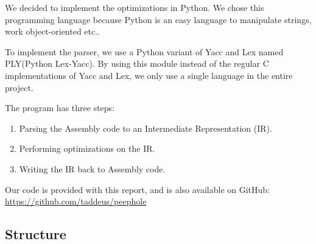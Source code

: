 \documentclass[10pt,a4paper]{article}
\begin{document}
We decided to implement the optimizations in Python. We chose this programming
language because Python is an easy language to manipulate strings, work
object-oriented etc..

To implement the parser, we use a Python variant of Yacc and Lex named
PLY(Python Lex-Yacc). By using this module instead of the regular C
implementations of Yacc and Lex, we only use a single language in the entire
project.

The program has three steps:
\begin{enumerate}
    \item Parsing the Assembly code to an Intermediate Representation (IR).
    \item Performing optimizations on the IR.
    \item Writing the IR back to Assembly code.
\end{enumerate}

Our code is provided with this report, and is also available on GitHub: \\
\url{https://github.com/taddeus/peephole}

\subsection{Structure}
\end{document}
